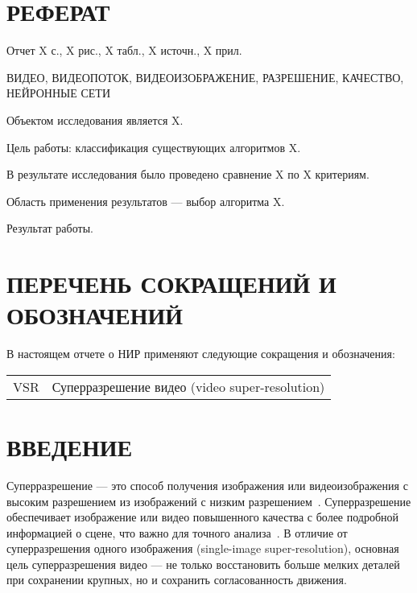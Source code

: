 \documentclass{bmstu}
\begin{document}


{\centering \chapter*{РЕФЕРАТ}}

Отчет X с., X рис., X табл., X источн., X прил.

\noindent ВИДЕО, ВИДЕОПОТОК, ВИДЕОИЗОБРАЖЕНИЕ, РАЗРЕШЕНИЕ, КАЧЕСТВО, НЕЙРОННЫЕ СЕТИ

Объектом исследования является X.

Цель работы: классификация существующих алгоритмов X.

В результате исследования было проведено сравнение X по X критериям.

Область применения результатов --- выбор алгоритма X.

Результат работы.

\maketableofcontents

{\centering \chapter*{ПЕРЕЧЕНЬ СОКРАЩЕНИЙ И ОБОЗНАЧЕНИЙ}}

В настоящем отчете о НИР применяют следующие сокращения и обозначения:

\begin{table}[H]
\begin{tabular}{p{3cm}p{13.5cm}}
VSR & Суперразрешение видео (video super-resolution)
\tabularnewline
\end{tabular}
\end{table}

{\centering \chapter*{ВВЕДЕНИЕ}}

Суперразрешение --- это способ получения изображения или видеоизображения с высоким разрешением из изображений с низким разрешением~\cite{Park2003}. 
Суперразрешение обеспечивает изображение или видео повышенного качества с более подробной информацией о сцене, что важно для точного анализа~\cite{Daithankar2021}. 
В отличие от суперразрешения одного изображения (single-image super-resolution), основная цель суперразрешения видео --- не только восстановить больше мелких деталей при сохранении крупных, но и сохранить согласованность движения.
\end{document}
